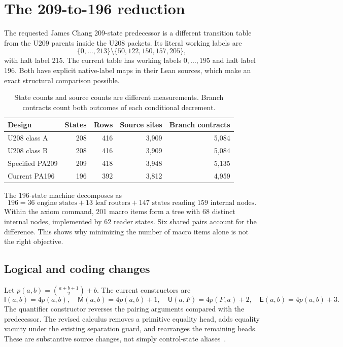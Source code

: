 \documentclass[11pt,letterpaper]{article}
\newcommand{\I}{\mathsf I}
\newcommand{\M}{\mathsf M}
\newcommand{\U}{\mathsf U}
\newcommand{\E}{\mathsf E}
\begin{document}
\section{The 209-to-196 reduction}
\label{sec:196}

The requested James Chang 209-state predecessor is a different transition
table from the U209 parents inside the U208 packets. Its literal working
labels are
\[
 \{0,\ldots,213\}\setminus\{50,122,150,157,205\},
\]
with halt label 215. The current table has working labels $0,\ldots,195$
and halt label 196. Both have explicit native-label maps in their Lean
sources, which make an exact structural comparison possible.

\begin{table}[ht]
\centering
\begin{tabular}{@{}lrrrr@{}}
\toprule
Design & States & Rows & Source sites & Branch contracts\\
\midrule
U208 class A & 208 & 416 & 3,909 & 5,084\\
U208 class B & 208 & 416 & 3,909 & 5,084\\
Specified PA209 & 209 & 418 & 3,948 & 5,135\\
Current PA196 & 196 & 392 & 3,812 & 4,959\\
\bottomrule
\end{tabular}
\caption{State counts and source counts are different measurements.
Branch contracts count both outcomes of each conditional decrement.}
\end{table}

The 196-state machine decomposes as
\[
 196=36\text{ engine states}+13\text{ leaf routers}
       +147\text{ states reading 159 internal nodes}.
\]
Within the axiom command, 201 macro items form a tree with 68 distinct
internal nodes, implemented by 62 reader states. Six shared pairs account
for the difference. This shows why minimizing the number of macro items
alone is not the right objective.

\subsection{Logical and coding changes}

Let $p(a,b)=\binom{a+b+1}{2}+b$. The current constructors are
\[
 \I(a,b)=4p(a,b),\quad \M(a,b)=4p(a,b)+1,\quad
 \U(a,F)=4p(F,a)+2,\quad \E(a,b)=4p(a,b)+3.
\]
The quantifier constructor reverses the pairing arguments compared with
the predecessor. The revised calculus removes a primitive equality head,
adds equality vacuity under the existing separation guard, and rearranges
the remaining heads. These are substantive source changes, not simply
control-state aliases~\cite{pa196,pa209}.
\end{document}
